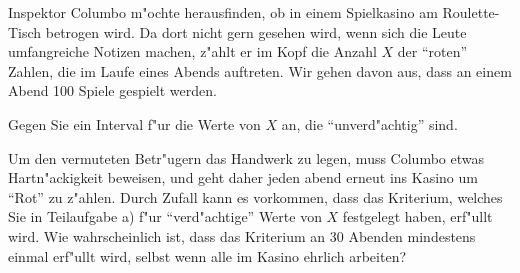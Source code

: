 Inspektor Columbo m"ochte herausfinden, ob in einem Spielkasino
am Roulette-Tisch betrogen wird.
Da dort nicht gern gesehen wird, wenn sich die Leute umfangreiche Notizen
machen, z"ahlt er im Kopf die Anzahl $X$ der ``roten'' Zahlen,
die im Laufe eines Abends auftreten.
Wir gehen davon aus, dass an einem Abend 100 Spiele gespielt werden.
\begin{teilaufgaben}
\item Gegen Sie ein Interval f"ur die Werte von $X$ an, die ``unverd"achtig''
sind.
\item Um den vermuteten Betr"ugern das Handwerk zu legen, muss Columbo
etwas Hartn"ackigkeit beweisen, und geht daher jeden abend erneut
ins Kasino um ``Rot'' zu z"ahlen. Durch Zufall kann es vorkommen, dass
das Kriterium, welches Sie in Teilaufgabe a) f"ur ``verd"achtige''
Werte von $X$ festgelegt haben, erf"ullt wird. Wie wahrscheinlich ist,
dass das Kriterium an 30 Abenden mindestens einmal erf"ullt wird, selbst
wenn alle im Kasino ehrlich arbeiten?
\end{teilaufgaben}

